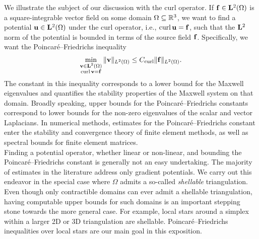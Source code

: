 \documentclass[10pt,letterpaper]{article}
\begin{document}

We illustrate the subject of our discussion with the curl operator. 
If ${\mathbf f} \in {\mathbf L}^{2}(\Omega)$ is a square-integrable vector field on some domain $\Omega \subseteq {\mathbb R}^3$, 
we want to find a potential ${\mathbf u} \in {\mathbf L}^2(\Omega)$ under the curl operator, i.e., $\operatorname{curl} {\mathbf u} = {\mathbf f}$, such that the ${\mathbf L}^2$ norm of the potential is bounded in terms of the source field ${\mathbf f}$. Specifically, we want the Poincar\'e--Friedrichs inequality %
\begin{align*}
    \min\limits_{ \substack{ {\mathbf v} \in {\mathbf L}^{2}(\Omega) \\ \operatorname{curl} {\mathbf v} = {\mathbf f} } } \| {\mathbf v} \|_{L^{2}(\Omega)}
    \leq 
    C_{\operatorname{curl}}
    \| {\mathbf f} \|_{L^{2}(\Omega)}
    .
\end{align*}
The constant in this inequality corresponds to a lower bound for the Maxwell eigenvalues and quantifies the stability properties of the Maxwell system on that domain. 
\color{blue}
Broadly speaking, upper bounds for the Poincar\'e--Friedrichs constants correspond to lower bounds for the non-zero eigenvalues of the scalar and vector Laplacians.
In numerical methods, estimates for the Poincar\'e--Friedrichs constant enter the stability and convergence theory of finite element methods, as well as spectral bounds for finite element matrices. 
\color{black}
\\



Finding a potential operator, whether linear or non-linear, and bounding the Poincar\'e--Friedrichs constant is generally not an easy undertaking. 
The majority of estimates in the literature address only gradient potentials. 
We carry out this endeavor in the special case where $\Omega$ admits a so-called \emph{shellable} triangulation. 
Even though only contractible domains can ever admit a shellable triangulation, 
having computable upper bounds for such domains is an important stepping stone towards the more general case. 
For example, local stars around a simplex within a larger 2D or 3D triangulation are shellable.
Poincar\'e--Friedrichs inequalities over local stars are our main goal in this exposition. 
\\
\end{document}
